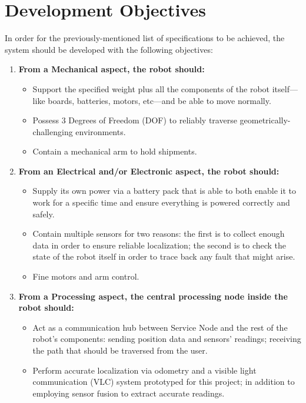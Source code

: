 \section{Development Objectives}
In order for the previously-mentioned list of specifications to be achieved, the system should be developed with the following objectives:
\begin{enumerate}
    \item \textbf{From a Mechanical aspect, the robot should:}
            \begin{itemize}
                \item Support the specified weight plus all the components of the robot itself---like boards, batteries, motors, etc---and be able to move normally.
                \item Possess 3 Degrees of Freedom (DOF) to reliably traverse geometrically-challenging environments.
                \item Contain a mechanical arm to hold shipments.
            \end{itemize}
    \item \textbf{From an Electrical and/or Electronic aspect, the robot should:}
            \begin{itemize}
                \item Supply its own power via a battery pack that is able to both enable it to work for a specific time and ensure everything is powered correctly and safely.
                \item Contain multiple sensors for two reasons: the first is to collect enough data in order to ensure reliable localization; the second is to check the state of the robot itself in order to trace back any fault that might arise.
                \item Fine motors and arm control.
            \end{itemize}
    \item \textbf{From a Processing aspect, the central processing node inside the robot should:}
            \begin{itemize}
                \item Act as a communication hub between Service Node and the rest of the robot's components: sending position data and sensors' readings; receiving the path that should be traversed from the user.
                \item Perform accurate localization via odometry and a visible light communication (VLC) system prototyped for this project; in addition to employing sensor fusion to extract accurate readings.  

\end{itemize}
\end{enumerate}
